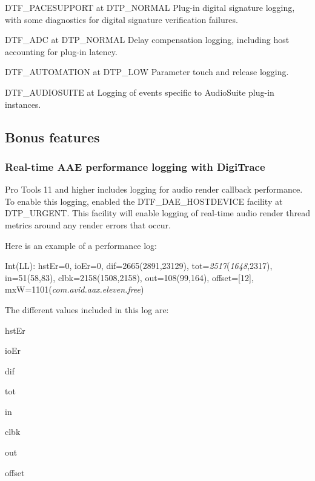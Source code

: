 \begin{DoxyItemize}
\item {\ttfamily D\+T\+F\+\_\+\+P\+A\+C\+E\+S\+U\+P\+P\+O\+R\+T} at {\ttfamily D\+T\+P\+\_\+\+N\+O\+R\+M\+A\+L} Plug-\/in digital signature logging, with some diagnostics for digital signature verification failures.  
\item {\ttfamily D\+T\+F\+\_\+\+A\+D\+C} at {\ttfamily D\+T\+P\+\_\+\+N\+O\+R\+M\+A\+L} Delay compensation logging, including host accounting for plug-\/in latency.  
\item {\ttfamily D\+T\+F\+\_\+\+A\+U\+T\+O\+M\+A\+T\+I\+O\+N} at {\ttfamily D\+T\+P\+\_\+\+L\+O\+W} Parameter touch and release logging.  
\item {\ttfamily D\+T\+F\+\_\+\+A\+U\+D\+I\+O\+S\+U\+I\+T\+E} at {\ttfamily } Logging of events specific to Audio\+Suite plug-\/in instances.  
\end{DoxyItemize}



 \hypertarget{a00364_digitrace__bonus_features}{}\subsection{Bonus features}\label{a00364_digitrace__bonus_features}
 \hypertarget{a00364_digitrace__performancelogging}{}\subsubsection{Real-\/time A\+A\+E performance logging with Digi\+Trace}\label{a00364_digitrace__performancelogging}
 Pro Tools 11 and higher includes logging for audio render callback performance. To enable this logging, enabled the {\ttfamily D\+T\+F\+\_\+\+D\+A\+E\+\_\+\+H\+O\+S\+T\+D\+E\+V\+I\+C\+E} facility at {\ttfamily D\+T\+P\+\_\+\+U\+R\+G\+E\+N\+T}. This facility will enable logging of real-\/time audio render thread metrics around any render errors that occur.

 Here is an example of a performance log\+:

 {\ttfamily Int(\+L\+L)\+: hst\+Er=0, io\+Er=0, dif=2665(2891,23129), tot={\itshape 2517}({\itshape 1648},2317), in=51(58,83), clbk=2158(1508,2158), out=108(99,164), offset=\mbox{[}12\mbox{]}, mx\+W=1101({\itshape com.\+avid.\+aax.\+eleven.\+free}) }

 The different values included in this log are\+:

 
\begin{DoxyItemize}
\item {\ttfamily hst\+Er }    
\item {\ttfamily io\+Er }    
\item {\ttfamily dif }    
\item {\ttfamily tot }    
\item {\ttfamily in }    
\item {\ttfamily clbk }    
\item {\ttfamily out }    
\item {\ttfamily offset }    
\end{DoxyItemize}

